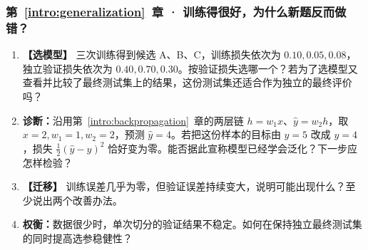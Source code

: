 \subsubsection*{第~\ref*{intro:generalization}~章 · 训练得很好，为什么新题反而做错？}
\begin{enumerate}[label={},leftmargin=4.8em,itemsep=4pt]
\item[\textbf{C-020.}] \leavevmode{}\label{exercise:C-020}\label{exercise:validation-checkpoint-choice}\textbf{【选模型】} 三次训练得到候选 A、B、C，训练损失依次为 $0.10,0.05,0.08$，独立验证损失依次为 $0.40,0.70,0.30$。按验证损失选哪一个？若为了选模型又查看并比较了最终测试集上的结果，这份测试集还适合作为独立的最终评价吗？
\item[\textbf{C-021.}] \leavevmode{}\label{exercise:C-021}\label{exercise:zero-loss-generalization}\textbf{诊断：}沿用第~\ref*{intro:backpropagation}~章的两层链 $h=w_1x$、$\widehat{y}=w_2h$，取 $x=2,w_1=1,w_2=2$，预测 $\widehat{y}=4$。若把这份样本的目标由 $y=5$ 改成 $y=4$，损失 $\tfrac12(\widehat{y}-y)^2$ 恰好变为零。能否据此宣称模型已经学会泛化？下一步应怎样检验？
\item[\textbf{C-022.}] \leavevmode{}\label{exercise:C-022}\label{exercise:validation-overfitting}\textbf{【迁移】} 训练误差几乎为零，但验证误差持续变大，说明可能出现什么？至少说出两个改善办法。
\item[\textbf{C-023.}] \leavevmode{}\label{exercise:C-023}\label{exercise:small-data-validation}\textbf{权衡：}数据很少时，单次切分的验证结果不稳定。如何在保持独立最终测试集的同时提高选参稳健性？
\end{enumerate}
